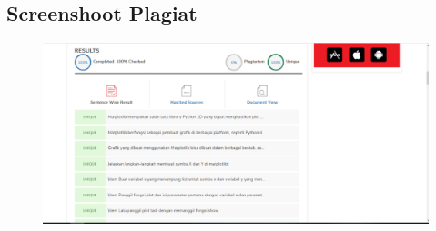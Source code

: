 \subsection{Screenshoot Plagiat}
\begin{figure}[H]
	\includegraphics[width=12cm]{figures/6/1174089/Praktek/plagiat.png}
	\centering
\end{figure}
